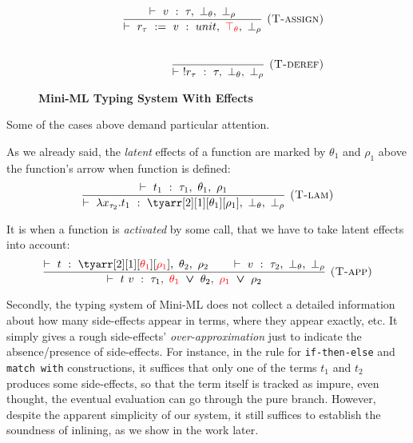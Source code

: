 \documentclass[a4paper,11pt,oneside]{article}
\theoremstyle{plain}
\newcommand{\bvee}{\boldsymbol{~\vee~}}
\newcommand{\typing}[4]{\vdash~#1~:~#2,~#3,~#4}
\newcommand{\bth}{\bot_\theta}
\newcommand{\brh}{\bot_\rho}
\newcommand{\tth}{\top_\theta}
\begin{document}
\begin{figure}[H]
\begin{adjustwidth}{-0em}{-1em}
\begin{small}
\begin{minipage}[t]{0.49\linewidth}
\begin{displaymath}
\begin{array}{rrr}
\hspace*{1cm}		
\dfrac
	{\typing{v}{\tau}{\bth}{\brh}}
	{\typing{r_{\tau}~:=~v}
		{unit}
		{\textcolor{red}{\tth}}
		{\brh}} 			
 	{\textsc{  (T-assign)}}	\\[1cm]		
\hspace*{2.5cm}		   			
\dfrac
	{}
	{\typing{!r_{\tau}}{\tau}{\bth}{\brh}} 
{\textsc{  (T-deref)}}

\end{array}
\end{displaymath}
\end{minipage} 	 		 
\end{small}
\end{adjustwidth}
\caption{\textbf{Mini-ML Typing System With Effects}}
\label{mini-ml-def-typ}	
\end{figure}    

 
  Some of the cases above demand particular attention.
  
   	
As we already said, the \textit{latent} effects of a function are marked by $\theta_1$ and $\rho_1$ above the function's arrow when function is defined:
  $$
  \dfrac
	{\typing{t_1}{\tau_1}{\theta_1}{\rho_1}}
	{\typing{\lambda x_{\tau_2} . t_1}
		{\tyarr[2][1][\theta_1][\rho_1]}{\bth}{\brh}}
	{\textsc{  (T-lam)}} $$	 
 
  It is when a function is \textit{activated} by some call, that we have to take latent effects into account: 
  $$\dfrac
	{
		\typing{t}{\tyarr[2][1][\textcolor{red}{\theta_1}][\textcolor{red}{\rho_1}]}{\theta_2}{\rho_2} \qquad
		\typing{v}{\tau_2}{\bth}{\brh}}
	{
		\typing{t~v}{\tau_1}{\textcolor{red}{\theta_1} \bvee \theta_2}{\textcolor{red}{\rho_1} \bvee \rho_2}}
	{
		\textsc{  (T-app)}} $$


Secondly, the typing system of Mini-ML does not collect a detailed information about how many side-effects appear in terms, where they appear exactly, etc. It simply gives a rough side-effects' \textit{over-approximation} just to indicate the absence/presence of side-effects. 
	For instance, in the rule for \texttt{if-then-else} and \texttt{match~with} constructions, it suffices that only one of the terms $t_1$ and $t_2$ produces some side-effects, so that the term itself is tracked as impure, even thought, the eventual evaluation can go through the pure branch. However, despite the apparent simplicity of our system, it still suffices to establish the soundness of inlining, as we show in the work later. \\
\end{document}
